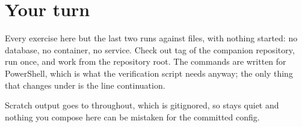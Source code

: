 \section*{Your turn}

Every exercise here but the last two runs against files, with nothing started:
no database, no container, no service. Check out tag  of the
companion repository, run  once, and work from the repository root.
The commands are written for PowerShell, which is what the verification script
needs anyway; the only thing that changes under  is the line
continuation.

Scratch output goes to  throughout, which is
gitignored, so  stays quiet and nothing you compose here can
be mistaken for the committed config.

